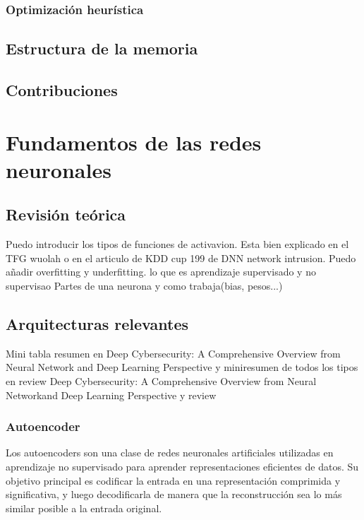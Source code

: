 \documentclass[12pt,a4paper]{book}
\begin{document}
\subsection{Optimización heurística} \label{Subsubsec: 1_2_4}



\section{Estructura de la memoria} \label{Subsubsec: 1_3}
  


\section{Contribuciones} \label{Subsec: 1_4}




\chapter{Fundamentos de las redes neuronales} \label{Capitulo_2}


 

\section{Revisión teórica} \label{Subsec: 3_1}
Puedo introducir los tipos de funciones de activavion. Esta bien explicado en el TFG wuolah o en el articulo de KDD cup 199 de DNN network intrusion.
Puedo añadir overfitting y underfitting.
lo que es aprendizaje supervisado y no supervisao
Partes de una neurona y como trabaja(bias, pesos...)


\section{Arquitecturas relevantes} \label{Subsec: 3_2}
Mini tabla resumen en Deep Cybersecurity: A Comprehensive Overview from Neural Network and Deep Learning Perspective y miniresumen de todos los tipos en review Deep Cybersecurity: A Comprehensive Overview from Neural Networkand Deep Learning Perspective y review
\subsection{Autoencoder}

Los autoencoders son una clase de redes neuronales artificiales utilizadas en aprendizaje no supervisado para aprender representaciones eficientes de datos. Su objetivo principal es codificar la entrada en una representación comprimida y significativa, y luego decodificarla de manera que la reconstrucción sea lo más similar posible a la entrada original.
\end{document}
